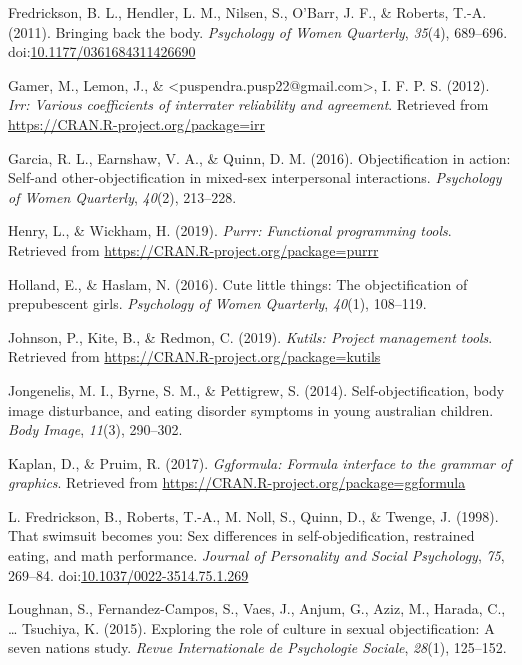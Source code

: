 \documentclass[man]{apa6}
\begin{document}
\hypertarget{ref-fredricksonetal2011}{}
Fredrickson, B. L., Hendler, L. M., Nilsen, S., O'Barr, J. F., \&
Roberts, T.-A. (2011). Bringing back the body. \emph{Psychology of Women
Quarterly}, \emph{35}(4), 689--696.
doi:\href{https://doi.org/10.1177/0361684311426690}{10.1177/0361684311426690}

\hypertarget{ref-R-irr}{}
Gamer, M., Lemon, J., \&
\textless{}puspendra.pusp22@gmail.com\textgreater{}, I. F. P. S. (2012).
\emph{Irr: Various coefficients of interrater reliability and
agreement}. Retrieved from \url{https://CRAN.R-project.org/package=irr}

\hypertarget{ref-garcia2016objectification}{}
Garcia, R. L., Earnshaw, V. A., \& Quinn, D. M. (2016). Objectification
in action: Self-and other-objectification in mixed-sex interpersonal
interactions. \emph{Psychology of Women Quarterly}, \emph{40}(2),
213--228.

\hypertarget{ref-R-purrr}{}
Henry, L., \& Wickham, H. (2019). \emph{Purrr: Functional programming
tools}. Retrieved from \url{https://CRAN.R-project.org/package=purrr}

\hypertarget{ref-holland2016}{}
Holland, E., \& Haslam, N. (2016). Cute little things: The
objectification of prepubescent girls. \emph{Psychology of Women
Quarterly}, \emph{40}(1), 108--119.

\hypertarget{ref-R-kutils}{}
Johnson, P., Kite, B., \& Redmon, C. (2019). \emph{Kutils: Project
management tools}. Retrieved from
\url{https://CRAN.R-project.org/package=kutils}

\hypertarget{ref-jongenelis2014}{}
Jongenelis, M. I., Byrne, S. M., \& Pettigrew, S. (2014).
Self-objectification, body image disturbance, and eating disorder
symptoms in young australian children. \emph{Body Image}, \emph{11}(3),
290--302.

\hypertarget{ref-R-ggformula}{}
Kaplan, D., \& Pruim, R. (2017). \emph{Ggformula: Formula interface to
the grammar of graphics}. Retrieved from
\url{https://CRAN.R-project.org/package=ggformula}

\hypertarget{ref-fredricksonetal1998}{}
L. Fredrickson, B., Roberts, T.-A., M. Noll, S., Quinn, D., \& Twenge,
J. (1998). That swimsuit becomes you: Sex differences in
self-objedification, restrained eating, and math performance.
\emph{Journal of Personality and Social Psychology}, \emph{75}, 269--84.
doi:\href{https://doi.org/10.1037/0022-3514.75.1.269}{10.1037/0022-3514.75.1.269}

\hypertarget{ref-loughnan2015}{}
Loughnan, S., Fernandez-Campos, S., Vaes, J., Anjum, G., Aziz, M.,
Harada, C., \ldots{} Tsuchiya, K. (2015). Exploring the role of culture
in sexual objectification: A seven nations study. \emph{Revue
Internationale de Psychologie Sociale}, \emph{28}(1), 125--152.
\end{document}
